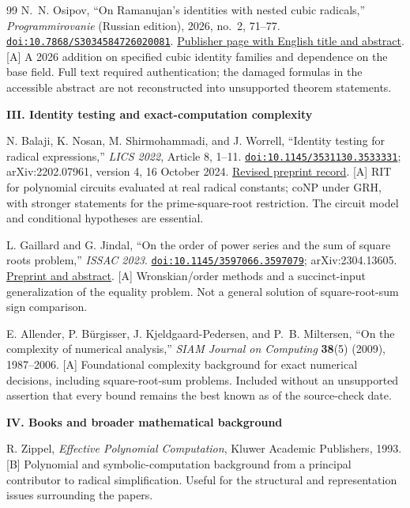 \documentclass[11pt,a4paper]{article}
\numberwithin{equation}{section}
\theoremstyle{definition}\newtheorem{definition}[theorem]{Definition}
\theoremstyle{remark}\newtheorem{remark}[theorem]{Remark}
\newcommand{\doi}[1]{\href{https://doi.org/#1}{\nolinkurl{doi:#1}}}
\newcommand{\access}[2]{\href{#1}{#2}}
\newcommand{\status}[1]{\textsf{\footnotesize[#1]}}
\newcommand{\bibgroup}[1]{\par\Needspace{7\baselineskip}\bigskip\item[]\textbf{#1}\par\smallskip}
\begin{document}
\begin{thebibliography}{99}
 N.~N. Osipov, ``On Ramanujan's identities with nested cubic radicals,'' \emph{Programmirovanie} (Russian edition), 2026, no.~2, 71--77. \doi{10.7868/S3034584726020081}.
\access{https://journals.rcsi.science/0132-3474/article/view/446083}{Publisher page with English title and abstract}. \status{A}
A 2026 addition on specified cubic identity families and dependence on the base field. Full text required authentication; the damaged formulas in the accessible abstract are not reconstructed into unsupported theorem statements.

\bibgroup{III. Identity testing and exact-computation complexity}

 N. Balaji, K. Nosan, M. Shirmohammadi, and J. Worrell, ``Identity testing for radical expressions,'' \emph{LICS 2022}, Article 8, 1--11. \doi{10.1145/3531130.3533331}; arXiv:2202.07961, version 4, 16 October 2024.
\access{https://arxiv.org/abs/2202.07961}{Revised preprint record}. \status{A}
RIT for polynomial circuits evaluated at real radical constants; coNP under GRH, with stronger statements for the prime-square-root restriction. The circuit model and conditional hypotheses are essential.

 L. Gaillard and G. Jindal, ``On the order of power series and the sum of square roots problem,'' \emph{ISSAC 2023}. \doi{10.1145/3597066.3597079}; arXiv:2304.13605.
\access{https://arxiv.org/abs/2304.13605}{Preprint and abstract}. \status{A}
Wronskian/order methods and a succinct-input generalization of the equality problem. Not a general solution of square-root-sum sign comparison.

 E. Allender, P. B\"urgisser, J. Kjeldgaard-Pedersen, and P.~B. Miltersen, ``On the complexity of numerical analysis,'' \emph{SIAM Journal on Computing} \textbf{38}(5) (2009), 1987--2006. \status{A}
Foundational complexity background for exact numerical decisions, including square-root-sum problems. Included without an unsupported assertion that every bound remains the best known as of the source-check date.

\bibgroup{IV. Books and broader mathematical background}

 R. Zippel, \emph{Effective Polynomial Computation}, Kluwer Academic Publishers, 1993. \status{B}
Polynomial and symbolic-computation background from a principal contributor to radical simplification. Useful for the structural and representation issues surrounding the papers.


\end{thebibliography}
\end{document}

